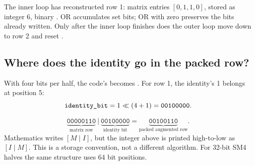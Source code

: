 \bigskip
The inner loop has reconstructed row 1: matrix entries $[0,1,1,0]$, stored as
integer 6, binary . OR accumulates set bits; OR with zero preserves
the bits already written. Only after the inner loop finishes does the outer
loop move down to row 2 and reset .

\begin{center}
\end{center}

\clearpage
\subsection{Where does the identity go in the packed row?}
With four bits per half, the code's  becomes
. For row 1, the identity's 1 belongs at position 5:
\[
\texttt{identity\_bit}=1\ll(4+1)=\texttt{00100000}.
\]
\begin{center}
\end{center}
\[
\underbrace{\texttt{00000110}}_{\text{matrix row}}
\ \big|\ \underbrace{\texttt{00100000}}_{\text{identity bit}}
=\underbrace{\texttt{00100110}}_{\text{packed augmented row}}.
\]
Mathematics writes $[M\mid I]$, but the integer above is printed high-to-low
as $[I\mid M]$. This is a storage convention, not a different algorithm.
For 32-bit SM4 halves the same structure uses 64 bit positions.

